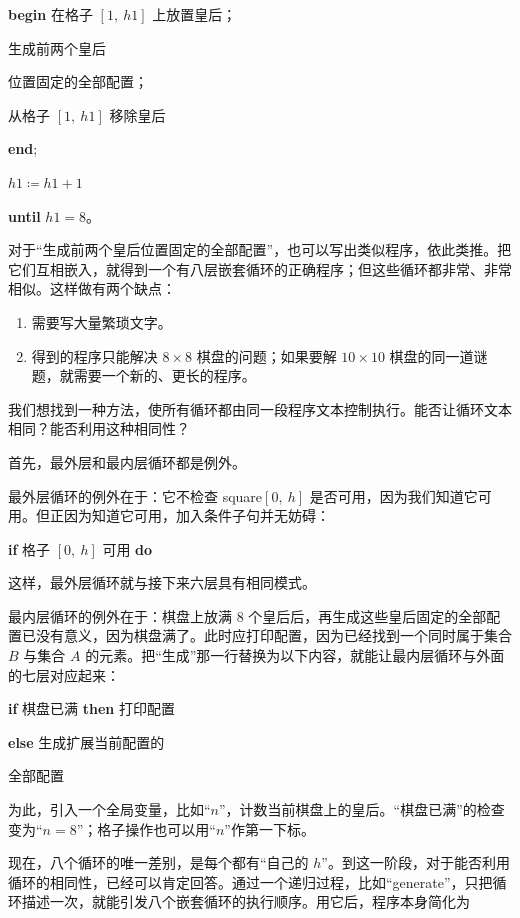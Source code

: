 \quad \textbf{begin} 在格子 $[1,\ h1]$ 上放置皇后；

\quad \quad 生成前两个皇后

\quad \quad \quad 位置固定的全部配置；

\quad \quad 从格子 $[1,\ h1]$ 移除皇后

\quad \textbf{end};

\quad $h1 \coloneq h1 + 1$

\textbf{until} $h1 = 8$。

对于“生成前两个皇后位置固定的全部配置”，也可以写出类似程序，依此类推。把它们互相嵌入，就得到一个有八层嵌套循环的正确程序；但这些循环都非常、非常相似。这样做有两个缺点：

\begin{enumerate}[wide, nosep, label=(\arabic*)]
	\item 需要写大量繁琐文字。
	\item 得到的程序只能解决 $8\times 8$ 棋盘的问题；如果要解 $10\times 10$ 棋盘的同一道谜题，就需要一个新的、更长的程序。
\end{enumerate}

我们想找到一种方法，使所有循环都由同一段程序文本控制执行。能否让循环文本相同？能否利用这种相同性？

首先，最外层和最内层循环都是例外。

最外层循环的例外在于：它不检查 square$[0,\ h]$ 是否可用，因为我们知道它可用。但正因为知道它可用，加入条件子句并无妨碍：

\quad \textbf{if} 格子 $[0,\ h]$ 可用 \textbf{do}

\noindent
这样，最外层循环就与接下来六层具有相同模式。

最内层循环的例外在于：棋盘上放满 8 个皇后后，再生成这些皇后固定的全部配置已没有意义，因为棋盘满了。此时应打印配置，因为已经找到一个同时属于集合 $B$ 与集合 $A$ 的元素。把“生成”那一行替换为以下内容，就能让最内层循环与外面的七层对应起来：

\textbf{if} 棋盘已满 \textbf{\textbf{then}} 打印配置

\quad \textbf{else} 生成扩展当前配置的

\quad\quad 全部配置

为此，引入一个全局变量，比如“$n$”，计数当前棋盘上的皇后。“棋盘已满”的检查变为“$n = 8$”；格子操作也可以用“$n$”作第一下标。

现在，八个循环的唯一差别，是每个都有“自己的 $h$”。到这一阶段，对于能否利用循环的相同性，已经可以肯定回答。通过一个递归过程，比如“generate”，只把循环描述一次，就能引发八个嵌套循环的执行顺序。用它后，程序本身简化为

